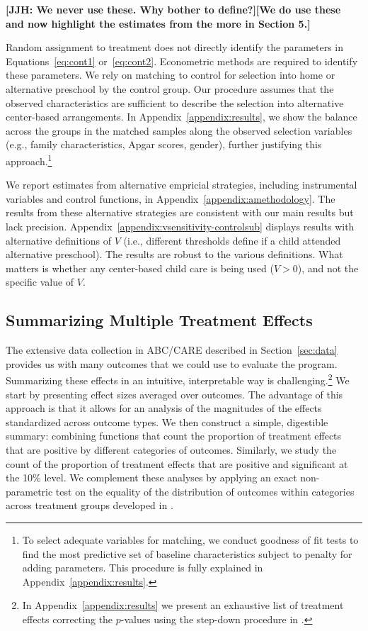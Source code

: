 \textbf{[JJH: We never use these. Why bother to define?][We do use these and now highlight the estimates from the more in Section 5.]}

Random assignment to treatment does not directly identify the parameters in Equations~\eqref{eq:cont1} or~\eqref{eq:cont2}. Econometric methods are required to identify these parameters. We rely on matching to control for selection into home or alternative preschool by the control group. Our procedure assumes that the observed characteristics are sufficient to describe the selection into alternative center-based arrangements. In Appendix~\ref{appendix:results}, we show the balance across the groups in the matched samples along the observed selection variables (e.g., family characteristics, Apgar scores, gender), further justifying this approach.\footnote{To select adequate variables for matching, we conduct goodness of fit tests to find the most predictive set of baseline characteristics subject to penalty for adding parameters. This procedure is fully explained in Appendix~\ref{appendix:results}.}

We report estimates from alternative empricial strategies, including instrumental variables and control functions, in Appendix~\ref{appendix:amethodology}. The results from these alternative strategies are consistent with our main results but lack precision. Appendix~\ref{appendix:vsensitivity-controlsub} displays results with alternative definitions of $V$ (i.e., different thresholds define if a child attended alternative preschool). The results are robust to the various definitions. What matters is whether any center-based child care is being used ($V>0$), and not the specific value of $V$.

\subsection{Summarizing Multiple Treatment Effects}\label{sec:combining-functions}

The extensive data collection in ABC/CARE described in Section~\ref{sec:data} provides us with many outcomes that we could use to evaluate the program. Summarizing these effects in an intuitive, interpretable way is challenging.\footnote{In Appendix~\ref{appendix:results} we present an exhaustive list of treatment effects correcting the $p$-values using the step-down procedure in \citet{Romano_Wolf_2016_pval_SaPL}.} We start by presenting effect sizes averaged over outcomes. The advantage of this approach is that it allows for an analysis of the magnitudes of the effects standardized across outcome types. We then construct a simple, digestible summary: combining functions that count the proportion of treatment effects that are positive by different categories of outcomes. Similarly, we study the count of the proportion of treatment effects that are positive and significant at the 10\% level. We complement these analyses by applying an exact non-parametric test on the equality of the distribution of outcomes within categories across treatment groups developed in \citet{Rosenbaum_2005_Distribution_JRSS}.

